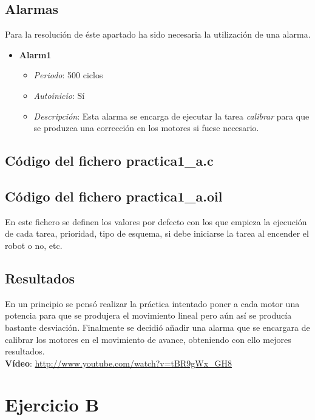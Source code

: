 \subsection{Alarmas}
Para la resolución de éste apartado ha sido necesaria la utilización de una alarma.

\begin{itemize}
	\item \textbf{Alarm1}
		\begin{itemize}
			\item \textit{Periodo}: 500 ciclos
			\item \textit{Autoinicio}: Sí
			\item \textit{Descripción}: Esta alarma se encarga de ejecutar la tarea \textit{calibrar} para que se produzca una corrección en los motores si fuese necesario.
		\end{itemize}
			
\end{itemize}
\subsection{Código del fichero practica1\_a.c}



\subsection{Código del fichero practica1\_a.oil}
En este fichero se definen los valores por defecto con los que empieza la ejecución de cada tarea, prioridad, tipo de esquema, si debe iniciarse la tarea al encender el robot o no, etc.



\subsection{Resultados}
En un principio se pensó realizar la práctica intentado poner a cada motor una potencia para que se produjera el movimiento lineal pero aún así se producía bastante desviación. Finalmente se decidió añadir una alarma que se encargara de calibrar los motores en el movimiento de avance, obteniendo con ello mejores resultados.\\

\textbf{Vídeo}:  \url{http://www.youtube.com/watch?v=tBR9gWx_GH8}
\section{Ejercicio B}

